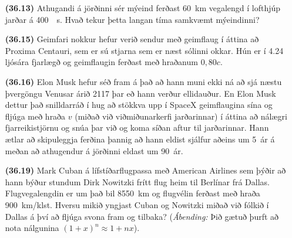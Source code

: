 \ifdefined \wholebook \else\documentclass[oneside]{book}\usepackage{EdlBook}\graphicspath{{figures/}}
\begin{document}
\begin{enumerate}[label = \textbf{(\alph*)}]


\item[\textbf{(36.13)}] Athugandi á jörðinni sér mýeind ferðast \SI{60}{km} vegalengd í lofthjúp jarðar á \SI{400}{\mu s}. Hvað tekur þetta langan tíma samkvæmt mýeindinni?

\item[\textbf{(36.15)}] Geimfari nokkur hefur verið sendur með geimflaug í áttina að Proxima Centauri, sem er sú stjarna sem er næst sólinni okkar. Hún er í \SI{4.24}{} ljósára fjarlægð og geimflaugin ferðast með hraðanum $0,80c$.

\item[\textbf{(36.16)}] Elon Musk hefur séð fram á það að hann muni ekki ná að sjá næstu þvergöngu Venusar árið 2117 þar eð hann verður ellidauður. En Elon Musk dettur það snilldarráð í hug að stökkva upp í SpaceX geimflaugina sína og fljúga með hraða $v$ (miðað við viðmiðunarkerfi jarðarinnar) í áttina að nálægri fjarreikistjörnu og snúa þar við og koma síðan aftur til jarðarinnar. Hann ætlar að skipuleggja ferðina þannig að hann eldist sjálfur aðeins um \SI{5}{ár} á meðan að athugendur á jörðinni eldast um \SI{90}{ár}. 

\item[\textbf{(36.19)}] Mark Cuban á lífstíðarflugpassa með American Airlines sem þýðir að hann býður stundum Dirk Nowitzki frítt flug heim til Berlínar frá Dallas. Flugvegalengdin er um það bil \SI{8550}{km} og flugvélin ferðast með hraða \SI{900}{km/klst}. Hversu mikið yngjast Cuban og Nowitzki miðað við fólkið í Dallas á því að fljúga svona fram og tilbaka? (\textit{Ábending:} Þið gætuð þurft að nota nálgunina $(1+x)^n \approx 1+ nx$).

\end{enumerate}
\end{document}
